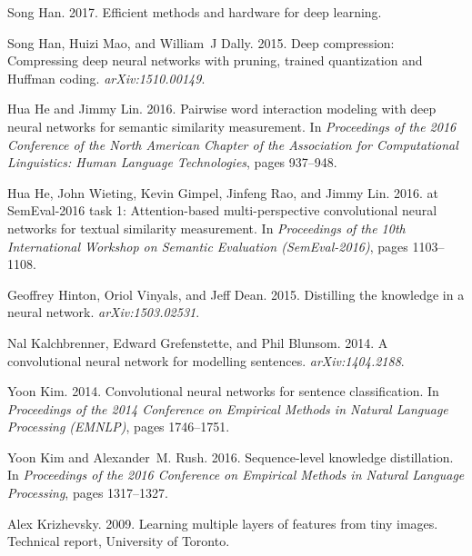\documentclass[11pt,a4paper]{article}
\begin{document}
\begin{thebibliography}{40}
Song Han. 2017.
\newblock Efficient methods and hardware for deep learning.

Song Han, Huizi Mao, and William~J Dally. 2015.
\newblock Deep compression: Compressing deep neural networks with pruning,
  trained quantization and {H}uffman coding.
\newblock \emph{arXiv:1510.00149}.

Hua He and Jimmy Lin. 2016.
\newblock Pairwise word interaction modeling with deep neural networks for
  semantic similarity measurement.
\newblock In \emph{Proceedings of the 2016 Conference of the North American
  Chapter of the Association for Computational Linguistics: Human Language
  Technologies}, pages 937--948.

Hua He, John Wieting, Kevin Gimpel, Jinfeng Rao, and Jimmy Lin. 2016.
 at {SemEval}-2016 task 1: Attention-based
  multi-perspective convolutional neural networks for textual similarity
  measurement.
\newblock In \emph{Proceedings of the 10th International Workshop on Semantic
  Evaluation (SemEval-2016)}, pages 1103--1108.

Geoffrey Hinton, Oriol Vinyals, and Jeff Dean. 2015.
\newblock Distilling the knowledge in a neural network.
\newblock \emph{arXiv:1503.02531}.

Nal Kalchbrenner, Edward Grefenstette, and Phil Blunsom. 2014.
\newblock A convolutional neural network for modelling sentences.
\newblock \emph{arXiv:1404.2188}.

Yoon Kim. 2014.
\newblock Convolutional neural networks for sentence classification.
\newblock In \emph{Proceedings of the 2014 Conference on Empirical Methods in
  Natural Language Processing (EMNLP)}, pages 1746--1751.

Yoon Kim and Alexander~M. Rush. 2016.
\newblock Sequence-level knowledge distillation.
\newblock In \emph{Proceedings of the 2016 Conference on Empirical Methods in
  Natural Language Processing}, pages 1317--1327.

Alex Krizhevsky. 2009.
\newblock Learning multiple layers of features from tiny images.
\newblock Technical report, University of Toronto.


\end{thebibliography}
\end{document}
